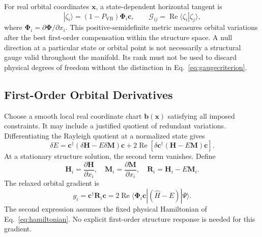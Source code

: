 \documentclass[12pt]{article}
\newcommand{\vb}{\mathrm{VB}}
\begin{document}
For real orbital coordinates \(\mathbf x\), a state-dependent horizontal tangent is
\begin{equation}
 |\zeta_i\rangle=(1-P_{\vb})\boldsymbol\Phi_i\mathbf c,
 \qquad
 \mathcal G_{ij}=\operatorname{Re}\langle\zeta_i|\zeta_j\rangle,
 \label{eq:horizontalmetric}
\end{equation}
where \(\boldsymbol\Phi_i=\partial\boldsymbol\Phi/\partial x_i\). This positive-semidefinite metric measures orbital variations after the best first-order compensation within the structure space. A null direction at a particular state or orbital point is not necessarily a structural gauge valid throughout the manifold. Its rank must not be used to discard physical degrees of freedom without the distinction in Eq.~\eqref{eq:gaugecriterion}.

\subsection{First-Order Orbital Derivatives}

Choose a smooth local real coordinate chart \(\mathbf b(\mathbf x)\) satisfying all imposed constraints. It may include a justified quotient of redundant variations. Differentiating the Rayleigh quotient at a normalized state gives
\begin{equation}
 \delta E=\mathbf c^\dagger(\delta\mathbf H-E\delta\mathbf M)\mathbf c
 +2\operatorname{Re}\left[
 \delta\mathbf c^\dagger(\mathbf H-E\mathbf M)\mathbf c\right].
 \label{eq:firstvariation}
\end{equation}
At a stationary structure solution, the second term vanishes. Define
\begin{equation}
 \mathbf H_i=\frac{\partial\mathbf H}{\partial x_i},\quad
 \mathbf M_i=\frac{\partial\mathbf M}{\partial x_i},\quad
 \mathbf R_i=\mathbf H_i-E\mathbf M_i.
 \label{eq:derivativeoperators}
\end{equation}
The relaxed orbital gradient is
\begin{equation}
 \boxed{g_i=\mathbf c^\dagger\mathbf R_i\mathbf c
 =2\operatorname{Re}\langle\boldsymbol\Phi_i\mathbf c|
                              (\hat H-E)|\Psi\rangle.}
 \label{eq:gradient}
\end{equation}
The second expression assumes the fixed physical Hamiltonian of Eq.~\eqref{eq:hamiltonian}. No explicit first-order structure response is needed for this gradient.
\end{document}

